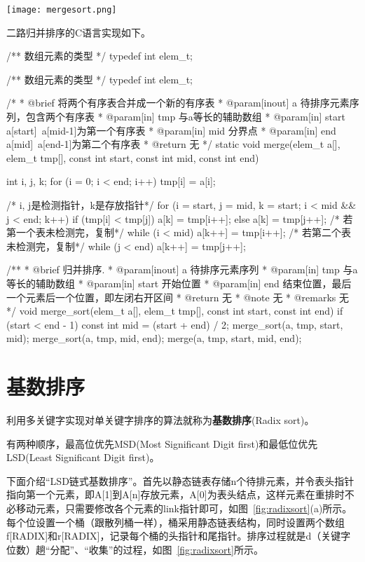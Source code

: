 \begin{center}
\texttt{[image: mergesort.png]}\\
\label{fig:mergesort}
\end{center}

二路归并排序的C语言实现如下。
\begin{Codex}[label=merge_sort.c]
/** 数组元素的类型 */
typedef int elem_t;

 /** 数组元素的类型 */
typedef int elem_t;

 /*
  * @brief 将两个有序表合并成一个新的有序表
  * @param[inout] a 待排序元素序列，包含两个有序表
  * @param[in] tmp 与a等长的辅助数组
  * @param[in] start a[start]~a[mid-1]为第一个有序表
  * @param[in] mid 分界点
  * @param[in] end a[mid]~a[end-1]为第二个有序表
  * @return 无
  */
static void merge(elem_t a[], elem_t tmp[], const int start, 
        const int mid, const int end) {
    int i, j, k;
    for (i = 0; i < end; i++) tmp[i] = a[i];

    /* i, j是检测指针，k是存放指针*/
    for (i = start, j = mid, k = start; i < mid && j < end; k++) {
        if (tmp[i] < tmp[j]) {
            a[k] = tmp[i++];
        } else {
            a[k] = tmp[j++];
        }
    }
    /* 若第一个表未检测完，复制*/
    while (i < mid) a[k++] = tmp[i++];
    /* 若第二个表未检测完，复制*/
    while (j < end) a[k++] = tmp[j++];
}

/**
  * @brief 归并排序.
  * @param[inout] a 待排序元素序列
  * @param[in] tmp 与a等长的辅助数组
  * @param[in] start 开始位置
  * @param[in] end 结束位置，最后一个元素后一个位置，即左闭右开区间
  * @return 无
  * @note 无
  * @remarks 无
  */
void merge_sort(elem_t a[], elem_t tmp[], const int start, const int end) {
    if (start < end - 1) {
        const int mid = (start + end) / 2;
        merge_sort(a, tmp, start, mid);
        merge_sort(a, tmp, mid, end);
        merge(a, tmp, start, mid, end);
    }
}
\end{Codex}


\section{基数排序} %
利用多关键字实现对单关键字排序的算法就称为\textbf{基数排序}(Radix sort)。

有两种顺序，最高位优先MSD(Most Significant Digit first)和最低位优先LSD(Least Significant Digit first)。

下面介绍“LSD链式基数排序”。首先以静态链表存储n个待排元素，并令表头指针指向第一个元素，即A[1]到A[n]存放元素，A[0]为表头结点，这样元素在重排时不必移动元素，只需要修改各个元素的link指针即可，如图~\ref{fig:radixsort}(a)所示。每个位设置一个桶（跟散列桶一样），桶采用静态链表结构，同时设置两个数组f[RADIX]和r[RADIX]，记录每个桶的头指针和尾指针。排序过程就是d（关键字位数）趟“分配”、“收集”的过程，如图~\ref{fig:radixsort}所示。

